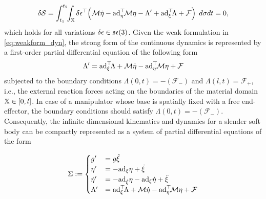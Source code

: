 %
\begin{equation}
\delta\mathcal{S} = \int_{t_1}^{t_2} \!\! \int_{\mathbb{X}}\delta {\epsilon}^\top \!\left(  \mathcal{M}\dot{{\eta}} - \text{ad}_{{\eta}}^\top \! \mathcal{M} {\eta} - \Lambda' + \text{ad}_{{\xi}}^\top \! \Lambda + \mathcal{F}\right)\;d\sigma dt = 0, \label{eq:weakform_dyn}
\end{equation}
%
which holds for all variations $\delta {\epsilon} \in {\mathfrak{se}(3)}$. Given the weak formulation in \eqref{eq:weakform_dyn}, the strong form of the continuous dynamics is represented by a first-order partial differential equation of the following form
%
\begin{equation}
\Lambda' =  \text{ad}_{{\xi}}^\top \! \Lambda + \mathcal{M} \dot{{\eta}} - \text{ad}_{{\eta}}^\top \! \mathcal{M} {\eta}  +  \mathcal{F} \label{eq:cont_dyn_pde}
\end{equation}
%
subjected to the boundary conditions $\Lambda(0,t) = -(\mathcal{F}_{-})$ and $\Lambda(l,t) = \mathcal{F}_{+}$, i.e., the external reaction forces acting on the boundaries of the material domain $\mathbb{X} \in [0,l]$. In case of a manipulator whose base is spatially fixed with a free end-effector, the boundary conditions should satisfy $\Lambda(0,t) = -(\mathcal{F}_{-})$. Consequently, the infinite dimensional kinematics and dynamics for a slender soft body can be compactly represented as a system of partial differential equations of the form

\begin{equation}
\Sigma := 
\begin{cases}
 g' & = g \hat{\xi} \\ \eta' & =  -\text{ad}_\xi \eta + \dot{\xi} \\ \dot{\eta}' & = -\text{ad}_{\dot{\xi}} \eta - \text{ad}_{{\xi}} \dot{\eta} + \ddot{\xi} \\
\Lambda' & =  \text{ad}_{{\xi}}^\top \! \Lambda + \mathcal{M} \dot{{\eta}} - \text{ad}_{{\eta}}^\top \! \mathcal{M} {\eta}  +  \mathcal{F} 
\end{cases}
\label{eq:sys_pde}
\end{equation}


